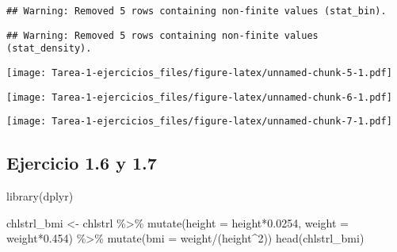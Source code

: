 \documentclass[
]{article}
\newenvironment{Shaded}{\begin{snugshade}}{\end{snugshade}}
\newcommand{\AttributeTok}[1]{\textcolor[rgb]{0.77,0.63,0.00}{#1}}
\newcommand{\DecValTok}[1]{\textcolor[rgb]{0.00,0.00,0.81}{#1}}
\newcommand{\FloatTok}[1]{\textcolor[rgb]{0.00,0.00,0.81}{#1}}
\newcommand{\FunctionTok}[1]{\textcolor[rgb]{0.00,0.00,0.00}{#1}}
\newcommand{\NormalTok}[1]{#1}
\newcommand{\OtherTok}[1]{\textcolor[rgb]{0.56,0.35,0.01}{#1}}
\newcommand{\SpecialCharTok}[1]{\textcolor[rgb]{0.00,0.00,0.00}{#1}}
\newcommand{\StringTok}[1]{\textcolor[rgb]{0.31,0.60,0.02}{#1}}
\begin{document}
\begin{verbatim}
## Warning: Removed 5 rows containing non-finite values (stat_bin).
\end{verbatim}

\begin{verbatim}
## Warning: Removed 5 rows containing non-finite values (stat_density).
\end{verbatim}

\texttt{[image: Tarea-1-ejercicios\_files/figure-latex/unnamed-chunk-5-1.pdf]}

\begin{Shaded}
\end{Shaded}

\texttt{[image: Tarea-1-ejercicios\_files/figure-latex/unnamed-chunk-6-1.pdf]}

\begin{Shaded}
\end{Shaded}

\texttt{[image: Tarea-1-ejercicios\_files/figure-latex/unnamed-chunk-7-1.pdf]}

\hypertarget{ejercicio-1.6-y-1.7}{%
\subsection{Ejercicio 1.6 y 1.7}\label{ejercicio-1.6-y-1.7}}

\begin{Shaded}
\begin{Highlighting}[]
\FunctionTok{library}\NormalTok{(dplyr)}

\NormalTok{chlstrl\_bmi }\OtherTok{\textless{}{-}}\NormalTok{ chlstrl }\SpecialCharTok{\%\textgreater{}\%} 
  \FunctionTok{mutate}\NormalTok{(}\AttributeTok{height =}\NormalTok{ height}\SpecialCharTok{*}\FloatTok{0.0254}\NormalTok{, }\AttributeTok{weight =}\NormalTok{ weight}\SpecialCharTok{*}\FloatTok{0.454}\NormalTok{) }\SpecialCharTok{\%\textgreater{}\%} 
  \FunctionTok{mutate}\NormalTok{(}\AttributeTok{bmi =}\NormalTok{ weight}\SpecialCharTok{/}\NormalTok{(height}\SpecialCharTok{\^{}}\DecValTok{2}\NormalTok{))}
\FunctionTok{head}\NormalTok{(chlstrl\_bmi)}
\end{Highlighting}
\end{Shaded}
\end{document}
